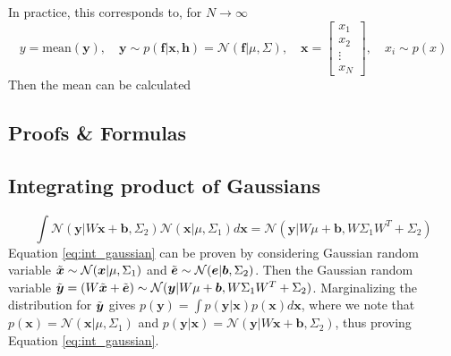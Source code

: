 \documentclass{article}
\begin{document}
In practice, this corresponds to, for $N\rightarrow\infty$
\begin{equation}
    y=\text{mean}(\boldsymbol{y}),\quad \boldsymbol{y}\sim p(\boldsymbol{f}|\boldsymbol{x},\boldsymbol{h})=\mathcal{N}(\boldsymbol{f}|\mu, \Sigma),
    \quad \boldsymbol{x}=\begin{bmatrix}
        x_1 \\ x_2 \\ \vdots \\ x_N
    \end{bmatrix},\quad x_i\sim p(x)
\end{equation}
Then the mean can be calculated 


\newpage
\printbibliography
\newpage
\begin{appendices}
    \section{Proofs \& Formulas}
    \subsection{Integrating product of Gaussians}
    \begin{equation}
        \int\mathcal{N}(\boldsymbol{y}|W\boldsymbol{x}+\boldsymbol{b},\Sigma_2)\mathcal{N}(\boldsymbol{x}|\mu,\Sigma_1)d\boldsymbol{x}=\mathcal{N}(\boldsymbol{y}|W\mu+\boldsymbol{b},W\Sigma_1W^T+\Sigma_2)
        \label{eq:int_gaussian}
    \end{equation}
    Equation \ref{eq:int_gaussian} can be proven by considering Gaussian random variable $\Tilde{\boldsymbol{x}}\sim\mathcal{N}(\boldsymbol{x}|\mu,\Sigma_1)$ and $\Tilde{\boldsymbol{e}}\sim\mathcal{N}(\boldsymbol{e}|\boldsymbol{b},\Sigma_2)$. Then the Gaussian random variable $\Tilde{\boldsymbol{y}}=(W\Tilde{\boldsymbol{x}}+\Tilde{\boldsymbol{e}})\sim\mathcal{N}(\boldsymbol{y}|W\mu+\boldsymbol{b},W\Sigma_1W^T+\Sigma_2)$. Marginalizing the distribution for $\Tilde{\boldsymbol{y}}$ gives $p(\boldsymbol{y})=\int p(\boldsymbol{y}|\boldsymbol{x})p(\boldsymbol{x})d\boldsymbol{x}$, where we note that $p(\boldsymbol{x})=\mathcal{N}(\boldsymbol{x}|\mu,\Sigma_1)$ and $p(\boldsymbol{y}|\boldsymbol{x})=\mathcal{N}(\boldsymbol{y}|W\boldsymbol{x}+\boldsymbol{b},\Sigma_2)$, thus proving Equation \ref{eq:int_gaussian}.


\end{appendices}
\end{document}
